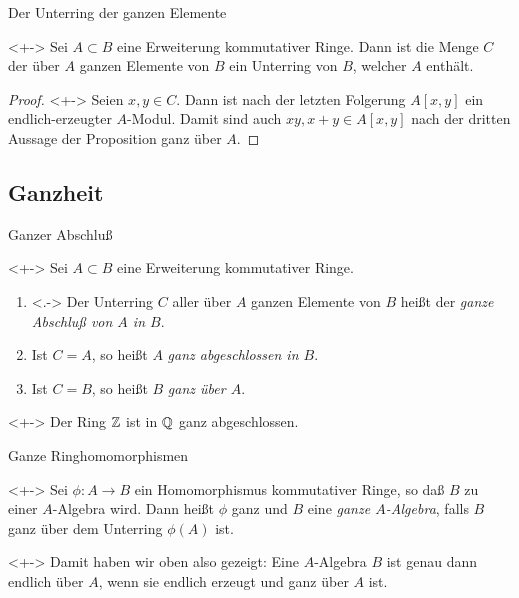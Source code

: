 \begin{frame}{Der Unterring der ganzen Elemente}
	\begin{corollary}<+->
		Sei \(A \subset B\) eine Erweiterung kommutativer Ringe. Dann ist
		die Menge \(C\) der über \(A\) ganzen Elemente von \(B\) ein Unterring
		von \(B\), welcher \(A\) enthält.
	\end{corollary}
	\begin{proof}<+->
		Seien \(x, y \in C\). Dann ist nach der letzten Folgerung \(A[x, y]\)
		ein endlich-erzeugter \(A\)-Modul. Damit sind auch
		\(xy, x + y \in A[x, y]\) nach der dritten Aussage der Proposition
		ganz über \(A\). 
	\end{proof}
\end{frame}

\subsection{Ganzheit}

\begin{frame}{Ganzer Abschluß}
	\begin{definition}<+->
		Sei \(A \subset B\) eine Erweiterung kommutativer Ringe.
		\begin{enumerate}[<+->]
		\item<.->
			Der Unterring \(C\) aller über \(A\) ganzen Elemente von \(B\) heißt der
			\emph{ganze Abschluß von \(A\) in \(B\)}.
		\item
			Ist \(C = A\), so heißt \(A\) \emph{ganz abgeschlossen in \(B\)}.
		\item
			Ist \(C = B\), so heißt \(B\) \emph{ganz über \(A\)}.
		\end{enumerate}
	\end{definition}
	\begin{example}<+->
		Der Ring \(\mathbb Z\) ist in \(\mathbb Q\) ganz abgeschlossen.
	\end{example}
\end{frame}

\begin{frame}{Ganze Ringhomomorphismen}
	\begin{definition}<+->
		Sei \(\phi\colon A \to B\) ein Homomorphismus kommutativer Ringe, so daß
		\(B\) zu einer \(A\)-Algebra wird. Dann heißt \(\phi\) ganz und \(B\)
		eine \emph{ganze \(A\)-Algebra}, falls \(B\) ganz über dem Unterring
		\(\phi(A)\) ist.
	\end{definition}
	\begin{visibleenv}<+->
		Damit haben wir oben also gezeigt: Eine \(A\)-Algebra \(B\) ist genau
		dann endlich über \(A\), wenn sie endlich erzeugt und ganz über \(A\)
		ist.
	\end{visibleenv}	
\end{frame}

